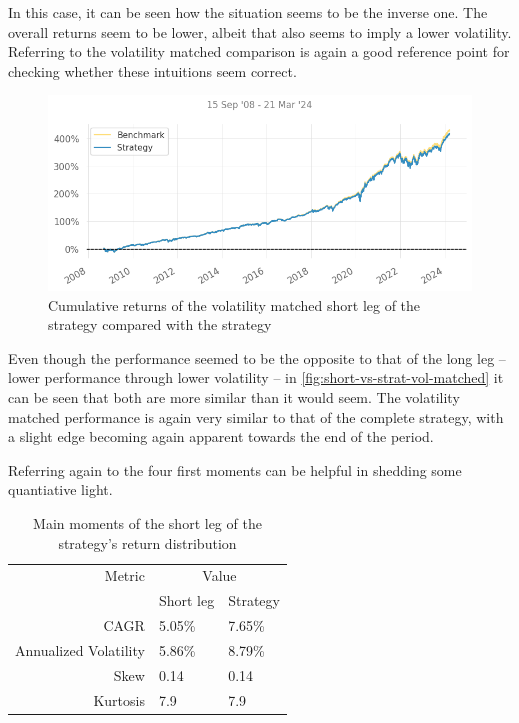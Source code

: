 In this case, it can be seen how the situation seems to be the inverse one. The overall returns seem to be lower, albeit that also seems to imply a lower volatility. Referring to the volatility matched comparison is again a good reference point for checking whether these intuitions seem correct.
\begin{figure}[ht]
    \captionsetup{justification=centering}
    \includegraphics[width=\linewidth]{assets/short-vs-strat-vol-matched.png}
    \caption{Cumulative returns of the volatility matched short leg of the strategy compared with the strategy}
    \label{fig:short-vs-strat-vol-matched}
\end{figure}

Even though the performance seemed to be the opposite to that of the long leg -- lower performance through lower volatility -- in \autoref{fig:short-vs-strat-vol-matched} it can be seen that both are more similar than it would seem. The volatility matched performance is again very similar to that of the complete strategy, with a slight edge becoming again apparent towards the end of the period.

Referring again to the four first moments can be helpful in shedding some quantiative light.

\begin{table}[ht]
    \centering
    \begin{tabular}{rll}
        \toprule
        Metric & \multicolumn{2}{c}{Value} \\ 
        \cmidrule(lr){2-3}
            & Short leg & Strategy \\
        \midrule
        CAGR & 5.05\% & 7.65\% \\
        Annualized Volatility & 5.86\% & 8.79\% \\
        Skew & 0.14 & 0.14 \\
        Kurtosis & 7.9 & 7.9 \\
        \bottomrule
    \end{tabular}
    \caption{Main moments of the short leg of the strategy's return distribution}
    \label{table:main-moments-short-vs-strat}
\end{table}

